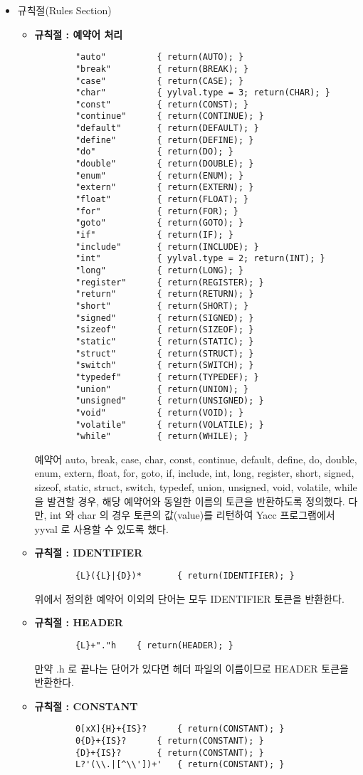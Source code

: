 \documentclass{article}
\begin{document}
\begin{itemize}
	\item 규칙절(Rules Section)	
	\begin{itemize}
		\item {\bf 규칙절 : 예약어 처리}
		\begin{lstlisting}
		"auto"			{ return(AUTO); }
		"break"			{ return(BREAK); }
		"case"			{ return(CASE); }
		"char"			{ yylval.type = 3; return(CHAR); }
		"const"			{ return(CONST); }
		"continue"		{ return(CONTINUE); }
		"default"		{ return(DEFAULT); }
		"define"		{ return(DEFINE); }
		"do"			{ return(DO); }
		"double"		{ return(DOUBLE); }
		"enum"			{ return(ENUM); }
		"extern"		{ return(EXTERN); }
		"float"			{ return(FLOAT); }
		"for"			{ return(FOR); }
		"goto"			{ return(GOTO); }
		"if"			{ return(IF); }
		"include"		{ return(INCLUDE); }
		"int"			{ yylval.type = 2; return(INT); }
		"long"			{ return(LONG); }
		"register"		{ return(REGISTER); }
		"return"		{ return(RETURN); }
		"short"			{ return(SHORT); }
		"signed"		{ return(SIGNED); }
		"sizeof"		{ return(SIZEOF); }
		"static"		{ return(STATIC); }
		"struct"		{ return(STRUCT); }
		"switch"		{ return(SWITCH); }
		"typedef"		{ return(TYPEDEF); }
		"union"			{ return(UNION); }
		"unsigned"		{ return(UNSIGNED); }
		"void"			{ return(VOID); }
		"volatile"		{ return(VOLATILE); }
		"while"			{ return(WHILE); }
		\end{lstlisting}
		예약어 auto, break, case, char, const, continue, default, define, do, double,
		enum, extern, float, for, goto, if, include, int, long, register, short, signed,
		sizeof, static, struct, switch, typedef, union, unsigned, void, volatile, while
		을 발견할 경우, 해당 예약어와 동일한 이름의 토큰을 반환하도록 정의했다. 다만, int 와 char 의 경우
		토큰의 값(value)를 리턴하여 Yacc 프로그램에서 yyval 로 사용할 수 있도록 했다.
		\item {\bf 규칙절 : IDENTIFIER}
		\begin{lstlisting}
		{L}({L}|{D})*		{ return(IDENTIFIER); }
		\end{lstlisting}
		위에서 정의한 예약어 이외의 단어는 모두 IDENTIFIER 토큰을 반환한다.

		\item {\bf 규칙절 : HEADER}
		\begin{lstlisting}
		{L}+"."h	{ return(HEADER); }
		\end{lstlisting}
		만약 .h 로 끝나는 단어가 있다면 헤더 파일의 이름이므로 HEADER 토큰을 반환한다.

		\item {\bf 규칙절 : CONSTANT}
		\begin{lstlisting}
		0[xX]{H}+{IS}?		{ return(CONSTANT); }
		0{D}+{IS}?		{ return(CONSTANT); }
		{D}+{IS}?		{ return(CONSTANT); }
		L?'(\\.|[^\\'])+'	{ return(CONSTANT); }
		

\end{lstlisting}
\end{itemize}
\end{itemize}
\end{document}
